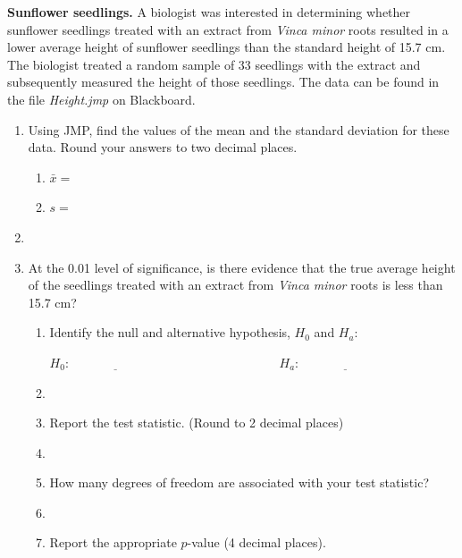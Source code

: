 \item \textbf{Sunflower seedlings.} A biologist was interested in determining whether sunflower seedlings treated with an extract from \textit{Vinca minor} roots resulted in a lower average height of sunflower seedlings than the standard height of 15.7 cm. The biologist treated a random sample of 33 seedlings with the extract and subsequently measured the height of those seedlings. The data can be found in the file \emph{Height.jmp} on Blackboard.

\begin{enumerate}
\item  Using JMP, find the values of the mean and the standard deviation for these data. Round your answers to two decimal places.
\begin{enumerate}
	\item $\bar{x} = $ \underline{\hspace{1in}}  
	\item  $s = $\underline{\hspace{1in}}
\end{enumerate}
\item[]
\item At the 0.01 level of significance, is there evidence that the true average height of the seedlings treated with an extract from \textit{Vinca minor} roots is less than 15.7 cm?  %
	\begin{enumerate}
		\item Identify the null and alternative hypothesis, $H_0$ and $H_a$: \\
	\begin{center}	
		$H_0:\underline{\hspace{3cm}} \hspace{4cm} H_a:\underline{\hspace{3cm}}$
	\end{center}
\item[]
\item Report the test statistic. (Round to 2 decimal places) \underline{\hspace{1in}}
\item[]
\item How many degrees of freedom are associated with your test statistic?
\item[]
\item Report the appropriate $p$-value (4 decimal places).
\newpage

\end{enumerate}
\end{enumerate}
